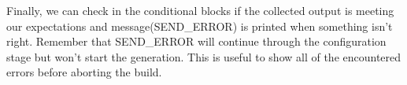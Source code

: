 Finally, we can check in the conditional blocks if the collected output is meeting our expectations and message(SEND\_ERROR) is printed when something isn't right. Remember that SEND\_ERROR will continue through the configuration stage but won't start the generation. This is useful to show all of the encountered errors before aborting the build.



















